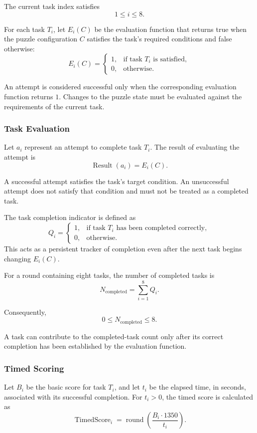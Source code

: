 \documentclass[12pt]{article}
\begin{document}
The current task index satisfies
\[
    1 \leq i \leq 8.
\]

For each task \(T_i\), let \(E_i(C)\) be the evaluation function
that returns true when the puzzle configuration \(C\) satisfies
the task's required conditions and false otherwise:
\[
    E_i(C) =
    \begin{cases}
        1, & \text{if task } T_i \text{ is satisfied},\\
        0, & \text{otherwise}.
    \end{cases}
\]

An attempt is considered successful only when the corresponding
evaluation function returns \(1\). Changes to the puzzle state
must be evaluated against the requirements of the current task.

\subsubsection{Task Evaluation}

Let \(a_i\) represent an attempt to complete task \(T_i\). The
result of evaluating the attempt is
\[
    \operatorname{Result}(a_i) = E_i(C).
\]

A successful attempt satisfies the task's target condition.
An unsuccessful attempt does not satisfy that condition and must
not be treated as a completed task.

The task completion indicator is defined as
\[
    Q_i =
    \begin{cases}
        1, & \text{if task } T_i \text{ has been completed correctly},\\
        0, & \text{otherwise}.
    \end{cases}
\]
This acts as a persistent tracker of completion even after the next task begins changing \(E_i(C)\).

For a round containing eight tasks, the number of completed tasks is
\[
    N_{\mathrm{completed}}
    = \sum_{i=1}^{8} Q_i.
\]

Consequently,
\[
    0 \leq N_{\mathrm{completed}} \leq 8.
\]

A task can contribute to the completed-task count only after its
correct completion has been established by the evaluation function.

\subsubsection{Timed Scoring}

Let \(B_i\) be the basic score for task \(T_i\), and let \(t_i\)
be the elapsed time, in seconds, associated with its successful
completion. For \(t_i > 0\), the timed score is calculated as
\[
    \operatorname{TimedScore}_i
    =
    \operatorname{round}
    \left(
        \frac{B_i \cdot 1350}{t_i}
    \right).
\]
\end{document}
